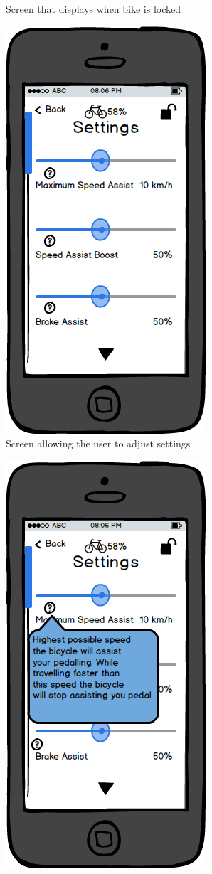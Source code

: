 \documentclass[a4paper]{report}
\begin{document}
{\begin{figure}
\caption{Screen that displays when bike is locked}
\end{figure}
\clearpage
\begin{figure}
\centering
\includegraphics[scale=0.9]{figures/prototype_2/settings}
\caption{Screen allowing the user to adjust settings}
\end{figure}
\clearpage
\begin{figure}
\centering
\includegraphics[scale=0.9]{figures/prototype_2/settings_help_1}

\end{figure}}
\end{document}

